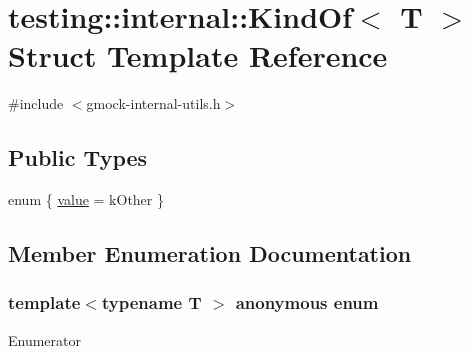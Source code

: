 \hypertarget{structtesting_1_1internal_1_1KindOf}{}\section{testing\+:\+:internal\+:\+:Kind\+Of$<$ T $>$ Struct Template Reference}
\label{structtesting_1_1internal_1_1KindOf}


{\ttfamily \#include $<$gmock-\/internal-\/utils.\+h$>$}

\subsection*{Public Types}
\begin{DoxyCompactItemize}
\item 
enum \{ \hyperlink{structtesting_1_1internal_1_1KindOf_a4866389a4bc8d5522b5f8ae61a42f520a30d28b30579739dfb2d410825ac3aaa8}{value} = k\+Other
 \}
\end{DoxyCompactItemize}


\subsection{Member Enumeration Documentation}
\subsubsection[{\texorpdfstring{anonymous enum}{anonymous enum}}]{\setlength{\rightskip}{0pt plus 5cm}template$<$typename T $>$ anonymous enum}\hypertarget{structtesting_1_1internal_1_1KindOf_a4866389a4bc8d5522b5f8ae61a42f520}{}\label{structtesting_1_1internal_1_1KindOf_a4866389a4bc8d5522b5f8ae61a42f520}
\begin{Desc}
\item[Enumerator]\par
\begin{description}
\item[{\em 
value\hypertarget{structtesting_1_1internal_1_1KindOf_a4866389a4bc8d5522b5f8ae61a42f520a30d28b30579739dfb2d410825ac3aaa8}{}\label{structtesting_1_1internal_1_1KindOf_a4866389a4bc8d5522b5f8ae61a42f520a30d28b30579739dfb2d410825ac3aaa8}
}]\end{description}
\end{Desc}

